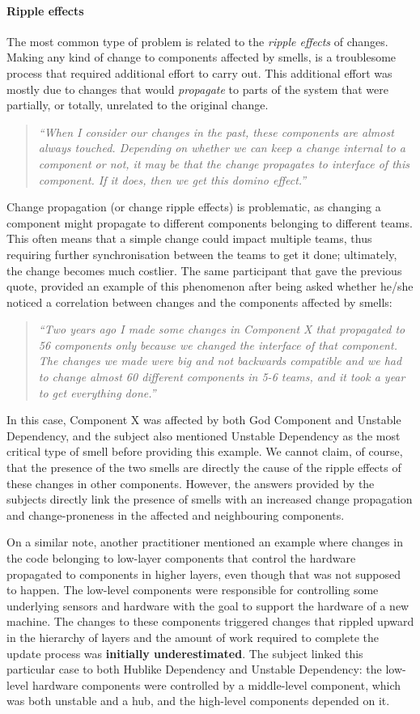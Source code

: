 \paragraph{Ripple effects}
The most common type of problem is related to the \emph{ripple effects} of changes. Making any kind of change to components affected by smells, is a 
troublesome process that required additional effort to carry out.
This additional effort was mostly due to changes that would \emph{propagate} to parts of the system that were partially, or totally, unrelated to the original change.
\begin{quote}
    \emph{``When I consider our changes in the past, these components are almost always touched. Depending on whether we can keep a change internal to a component or not, it may be that the change propagates to interface of this component. If it does, then we get this domino effect.''}
\end{quote}
Change propagation (or change ripple effects) is problematic, as changing a component might propagate to different components belonging to different teams.
This often means that a simple change could impact multiple teams, thus requiring further synchronisation between the teams to get it done; ultimately, the change becomes much costlier.
The same participant that gave the previous quote, provided an example of this phenomenon after being asked whether he/she noticed a correlation between changes and the components affected by smells:
\begin{quote}
    \emph{``Two years ago I made some changes in Component X that propagated to 56 components only because we changed the interface of that component. The changes we made were big and not backwards compatible and we had to change almost 60 different components in 5-6 teams, and it took a year to get everything done.''}
\end{quote}
In this case, Component X was affected by both God Component and Unstable Dependency, and the subject also mentioned Unstable Dependency as the most critical type of smell before providing this example.
We cannot claim, of course, that the presence of the two smells are directly the cause of the ripple effects of these changes in other components.
However, the answers provided by the subjects directly link the presence of smells with an increased change propagation and change-proneness in the affected and neighbouring components.

On a similar note, another practitioner mentioned an example where changes in the code belonging to low-layer components that control the hardware propagated to components in higher layers, even though that was not supposed to happen.
The low-level components were responsible for controlling some underlying sensors and hardware with the goal to support the hardware of a new machine.
The changes to these components triggered changes that rippled upward in the hierarchy of layers and the amount of work required to complete the update process was \textbf{initially underestimated}. The subject linked this particular case to both Hublike Dependency and Unstable Dependency: the low-level hardware components were controlled by a middle-level component, which was both unstable and a hub, and the high-level components depended on it.

